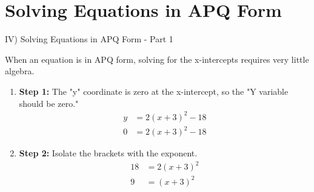\documentclass[aspectratio=169]{beamer}
\begin{document}
\section{Solving Equations in APQ Form}

\begin{frame}{IV) Solving Equations in APQ Form - Part 1}
    \begin{tcolorbox}[colback=lightgray,colframe=primary,title=Key Steps - Part 1]
        \footnotesize
        When an equation is in APQ form, solving for the x-intercepts requires very little algebra.
        \begin{enumerate}
            \item \textbf{Step 1:} The "y" coordinate is zero at the x-intercept, so the "Y variable should be zero."
                \begin{align*}
                    y &= 2(x+3)^2 - 18 \\
                    0 &= 2(x+3)^2 - 18
                \end{align*}
            \item \textbf{Step 2:} Isolate the brackets with the exponent.
                \begin{align*}
                    18 &= 2(x+3)^2 \\
                    9 &= (x+3)^2
                \end{align*}
        \end{enumerate}
    \end{tcolorbox}
\end{frame}
\end{document}

